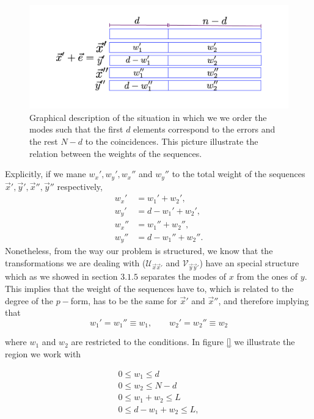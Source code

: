 \begin{figure}
\centering
\includegraphics[width = \textwidth]{Figures/Esquema-pformas.png}
\caption{Graphical description of the situation in which we we order the modes such that the first $d$ elements correspond to the errors and the rest $N-d$ to the coincidences. This picture illustrate the relation between the weights of the sequences.}
       \label{CH3:illustration_relation_with_weights}
\end{figure}
Explicitly, if we mane $w_x', w_y' , w_x''$ and $w_y''$ to the total weight of the sequences $\vec{x}',\vec{y}',\vec{x}'',\vec{y}''$ respectively,
\begin{equation}
\begin{aligned}
w_x' &= w_1' + w_2',\\
w_y' &= d-w_1' + w_2',\\
w_x'' &= w_1'' + w_2'',\\
w_y'' &= d-w_1'' + w_2''.
\end{aligned}
\label{CH3:Relations_with_the_Weights}
\end{equation} 
Nonetheless, from the way our problem is structured, we know that the transformations we are dealing with ($\mathcal{U}_{\vec{x}\vec{x}'}$ and $\mathcal{V}_{\vec{y}\vec{y}'}$) have an special structure which as we showed in section $3.1.5$ separates the modes of $x$ from the ones of $y$. This implies that the weight of the sequences have to, which is related to the degree of the $p-$form, has to be the same for $\vec{x}'$ and $\vec{x}''$, and therefore implying that
\begin{equation}
w_1' = w_1'' \equiv w_1, \qquad w_2' = w_2'' \equiv w_2
\end{equation} 

where $w_1$ and $w_2$ are restricted to the conditions. In figure \ref{} we illustrate the region we work with

\begin{equation}
\begin{array}{c}
0 \leq w_{1} \leq d \\
0 \leq w_{2}\leq N-d \\
0 \leq w_{1}+w_{2}\leq L\\
0 \leq d-w_{1}+w_{2} \leq L,
\end{array}
\label{CH3:region_to_bound}
\end{equation}


